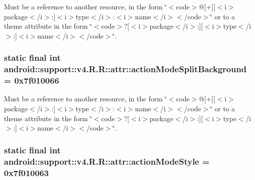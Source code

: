 Must be a reference to another resource, in the form \char`\"{}$<$code$>$@\mbox{[}+\mbox{]}\mbox{[}$<$i$>$package$<$/i$>$:\mbox{]}$<$i$>$type$<$/i$>$:$<$i$>$name$<$/i$>$$<$/code$>$\char`\"{} or to a theme attribute in the form \char`\"{}$<$code$>$?\mbox{[}$<$i$>$package$<$/i$>$:\mbox{]}\mbox{[}$<$i$>$type$<$/i$>$:\mbox{]}$<$i$>$name$<$/i$>$$<$/code$>$\char`\"{}. \hypertarget{classandroid_1_1support_1_1v4_1_1_r_1_1attr_893269c20db2085e7a5a35d46bab6008}{
\subsubsection[{actionModeSplitBackground}]{\setlength{\rightskip}{0pt plus 5cm}static final int android::support::v4.R.R::attr::actionModeSplitBackground = 0x7f010066}}
\label{classandroid_1_1support_1_1v4_1_1_r_1_1attr_893269c20db2085e7a5a35d46bab6008}


Must be a reference to another resource, in the form \char`\"{}$<$code$>$@\mbox{[}+\mbox{]}\mbox{[}$<$i$>$package$<$/i$>$:\mbox{]}$<$i$>$type$<$/i$>$:$<$i$>$name$<$/i$>$$<$/code$>$\char`\"{} or to a theme attribute in the form \char`\"{}$<$code$>$?\mbox{[}$<$i$>$package$<$/i$>$:\mbox{]}\mbox{[}$<$i$>$type$<$/i$>$:\mbox{]}$<$i$>$name$<$/i$>$$<$/code$>$\char`\"{}. \hypertarget{classandroid_1_1support_1_1v4_1_1_r_1_1attr_e0b4514a311cca4e01310c58c75bff64}{
\subsubsection[{actionModeStyle}]{\setlength{\rightskip}{0pt plus 5cm}static final int android::support::v4.R.R::attr::actionModeStyle = 0x7f010063}}
\label{classandroid_1_1support_1_1v4_1_1_r_1_1attr_e0b4514a311cca4e01310c58c75bff64}



